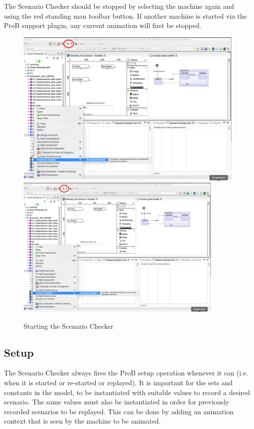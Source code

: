 The Scenario Checker should be stopped by selecting the machine again and using the red standing man toolbar button.
If another machine is started via the ProB support plugin, any current animation will first be stopped.


\begin{figure}[!htbp]
  \centering
  \ifplastex
  \includegraphics[width=512]{figures/starting}
  \else
  \includegraphics[width=0.9\textwidth]{figures/starting}
  \fi
  \caption{Starting the Scenario Checker}
  \label{fig:starting}
\end{figure}

\subsection{Setup}
\label{sec:setup}

The Scenario Checker always fires the ProB setup operation whenever it can (i.e. when it is started or re-started or replayed).
It is important for the sets and constants in the model, to be instantiated with suitable values to record a desired scenario.
The same values must also be instantiated in order for previously recorded scenarios to be replayed.
This can be done by adding an animation context that is seen by the machine to be animated.

